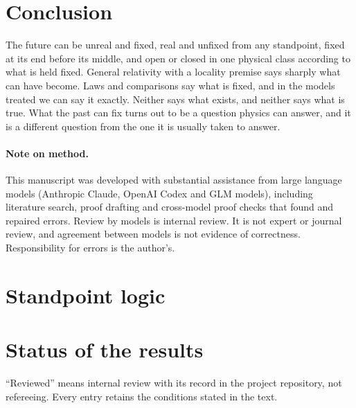 \documentclass[11pt]{article}
\theoremstyle{definition}
\begin{document}
\section{Conclusion}\label{sec:conclusion}

The future can be unreal and fixed, real and unfixed from any standpoint, fixed at its end before its middle, and open or closed in one physical class
according to what is held fixed. General relativity with a locality premise says sharply what can have become. Laws and comparisons say what is fixed, and in the models treated we can say it exactly. Neither says what exists, and neither says what is true. What the past can fix turns out to be a question physics can answer, and it is a
different question from the one it is usually taken to answer.

\paragraph{Note on method.} This manuscript was developed with substantial assistance from large language models (Anthropic Claude, OpenAI Codex and GLM models), including
literature search, proof drafting and cross-model proof checks that found and repaired errors. Review by models is internal review. It is not expert or
journal review, and agreement between models is not evidence of correctness. Responsibility for errors is the author's.

\appendix



\section{Standpoint logic}\label{sec:logic}



\section{Status of the results}\label{app:status}

``Reviewed'' means internal review with its record in the project repository, not refereeing. Every entry retains the
conditions stated in the text.
\end{document}
